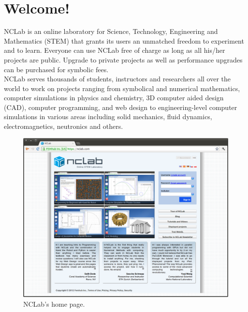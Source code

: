 \documentclass{article}
\begin{document}
\newpage

\pagestyle{plain}

\section{Welcome!}

NCLab is an online laboratory for Science, Technology, Engineering and Mathematics (STEM) that 
grants its users an unmatched freedom to experiment and to learn. Everyone can use NCLab free 
of charge as long as all his/her projects are public. Upgrade to private projects as well as 
performance upgrades can be purchased for symbolic fees.\\




\noindent
NCLab serves thousands of students, instructors and researchers all over the world to work on
projects ranging from symbolical and numerical mathematics, computer simulations in physics and 
chemistry, 3D computer aided design (CAD), computer programming, and web design to engineering-level 
computer simulations in various areas including solid mechanics, fluid dynamics, electromagnetics, 
neutronics and others. 

\begin{figure}[!ht]
\begin{center}
\includegraphics[width=\textwidth]{img/outside.png}
\end{center}
\vspace{-2mm}
\caption{NCLab's home page.}
\label{fig:outside}
\end{figure}
\end{document}
